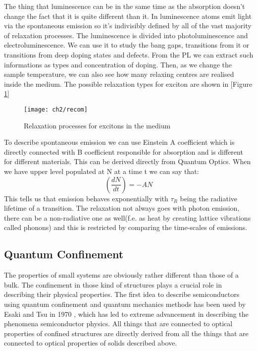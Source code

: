 The thing that luminescence can be in the same time as the absorption doesn't change the fact that it is quite different than it. In luminescence atoms emit light via the spontaneous emission so it's indivisibly defined by all of the vast majority of relaxation processes. The luminescence is divided into photoluminescence and electroluminescence. We can use it to study the bang gaps, transitions from it or transitions from deep doping states and defects. From the PL we can extract such informations as types and concentration of doping. Then, as we change the sample temperature, we can also see how many relaxing centres are realised inside the medium. The possible relaxation types for exciton are shown in [Figure \ref{fig:relax}]
\begin{figure}[H]
\centering
\texttt{[image: ch2/recom]}
\caption{Relaxation processes for excitons in the medium\cite{popko}}
\label{fig:relax}
\end{figure}

To describe spontaneous emission we can use Einstein A coefficient which is directly connected with B coefficient responsible for absorption and is different for different materials. This can be derived directly from Quantum Optics. When we have upper level populated at N at a time t we can say that:
\begin{equation}
\left( \frac{dN}{dt} \right) = -AN
\end{equation}
This tells us that emission behaves exponentially with $\tau_R $ being the radiative lifetime of a transition. The relaxation not always goes with photon emission, there can be a non-radiative one as well(f.e. as heat by creating lattice vibrations called phonons) and this is restricted by comparing the time-scales of emissions.  

\subsection{Quantum Confinement}

The properties of small systems are obviously rather different than those of a bulk. The confinement in those kind of structures plays a crucial role in describing their physical properties. The first idea to describe semiconductors using quantum confinement and quantum mechanics methods has been used by Esaki and Tsu in 1970 \cite{Esaki1970}, which has led to extreme advancement in describing the phenomena semiconductor physics. All things that are connected to optical properties of confined structures are directly derived from all the things that are connected to optical properties of solids described above. 

